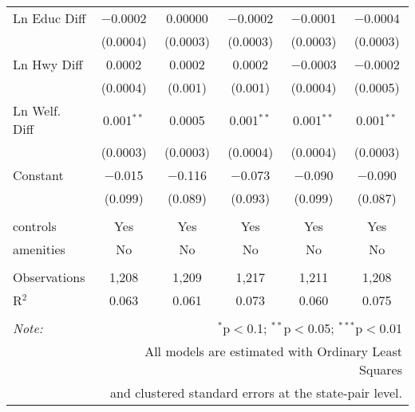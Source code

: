 \begin{table}[!htbp]
\begin{tabular}{@{\extracolsep{5pt}}lccccc}
  Ln Educ Diff & $-$0.0002 & 0.00000 & $-$0.0002 & $-$0.0001 & $-$0.0004 \\ 
  & (0.0004) & (0.0003) & (0.0003) & (0.0003) & (0.0003) \\ 
  Ln Hwy Diff & 0.0002 & 0.0002 & 0.0002 & $-$0.0003 & $-$0.0002 \\ 
  & (0.0004) & (0.001) & (0.001) & (0.0004) & (0.0005) \\ 
  Ln Welf. Diff & 0.001$^{**}$ & 0.0005 & 0.001$^{**}$ & 0.001$^{**}$ & 0.001$^{**}$ \\ 
  & (0.0003) & (0.0003) & (0.0004) & (0.0004) & (0.0003) \\ 
  Constant & $-$0.015 & $-$0.116 & $-$0.073 & $-$0.090 & $-$0.090 \\ 
  & (0.099) & (0.089) & (0.093) & (0.099) & (0.087) \\ 
 \hline \\[-1.8ex] 
controls & Yes & Yes & Yes & Yes & Yes \\ 
amenities & No & No & No & No & No \\ 
\hline \\[-1.8ex] 
Observations & 1,208 & 1,209 & 1,217 & 1,211 & 1,208 \\ 
R$^{2}$ & 0.063 & 0.061 & 0.073 & 0.060 & 0.075 \\ 
\hline 
\hline \\[-1.8ex] 
\textit{Note:}  & \multicolumn{5}{r}{$^{*}$p$<$0.1; $^{**}$p$<$0.05; $^{***}$p$<$0.01} \\ 
 & \multicolumn{5}{r}{All models are estimated with Ordinary Least Squares} \\ 
 & \multicolumn{5}{r}{and clustered standard errors at the state-pair level.} \\ 
\end{tabular} 
\end{table} 

